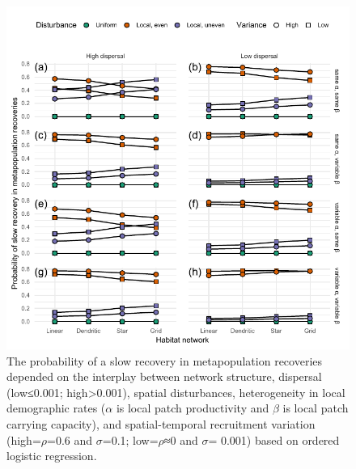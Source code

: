 \documentclass[
]{article}
\begin{document}
\begin{figure}[H]

{\centering \includegraphics{Managing_for_ecological_surprises_in_metapopulations_files/figure-latex/conditional probability for slow recovery-1} 

}

\caption{The probability of a slow recovery in metapopulation recoveries depended on the interplay between network structure, dispersal (low≤0.001; high>0.001), spatial disturbances, heterogeneity in local demographic rates ($\alpha$ is local patch productivity and $\beta$ is local patch carrying capacity), and spatial-temporal recruitment variation (high=$\rho$=0.6 and $\sigma$=0.1; low=$\rho$≈0 and $\sigma$= 0.001) based on ordered logistic regression.}\label{fig:conditional probability for slow recovery}
\end{figure}
\end{document}
